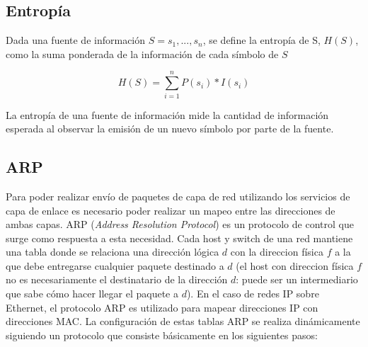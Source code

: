 \subsection{Entropía}

Dada una fuente de información $S={s_{1},...,s_{n}}$, se define la entropía de S, $H(S)$, como la suma ponderada de la información de cada símbolo de $S$

$$H(S)=\sum^{n}_{i=1}{P(s_{i})*I(s_{i})}$$

La entropía de una fuente de información mide la cantidad de información esperada al observar la emisión de un nuevo símbolo por parte de la fuente. 

\subsection{ARP}

Para poder realizar envío de paquetes de capa de red utilizando los servicios de capa de enlace es necesario poder realizar un mapeo entre las direcciones de ambas capas. ARP (\textsl{Address Resolution Protocol}) es un protocolo de control que surge como respuesta a esta necesidad. Cada host y switch de una red mantiene una tabla donde se relaciona una dirección lógica $d$ con la direccion física $f$ a la que debe entregarse cualquier paquete destinado a $d$ (el host con direccion física $f$ no es necesariamente el destinatario de la dirección $d$: puede ser un intermediario que sabe cómo hacer llegar el paquete a $d$). En el caso de redes IP sobre Ethernet, el protocolo ARP es utilizado para mapear direcciones IP con direcciones MAC.
La configuración de estas tablas ARP se realiza dinámicamente siguiendo un protocolo que consiste básicamente en los siguientes pasos:

